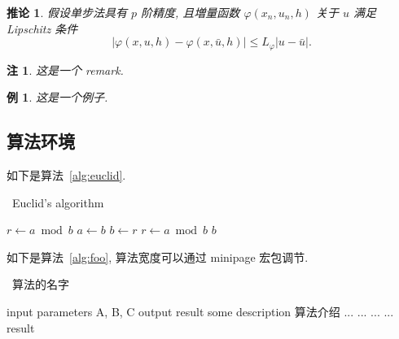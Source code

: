 \documentclass[zihao=-4,twoside,final]{ctexart}
\numberwithin{equation}{section}
\numberwithin{figure}{section}
\numberwithin{table}{section}
\theoremstyle{plain}
\newtheorem{example}{例}
\newtheorem{corollary}{推论}[section]
\newtheorem{remark}{注}[section]
\begin{document}
\begin{corollary}\label{col:convergence}
假设单步法具有 $p$ 阶精度, 且増量函数 $\varphi(x_{n}, u_{n}, h)$ 关于 $u$ 满足 \textup{Lipschitz} 条件
\begin{equation}\label{eq:conver3}
|\varphi(x, u, h)-\varphi(x, \bar{u}, h)| \leqslant L_{\varphi}|u-\bar{u}|.
\end{equation}
\end{corollary}

\begin{remark}\label{rem:remark}
这是一个 remark.
\end{remark}

\begin{example}
这是一个例子.
\end{example}


\clearpage
\subsection{算法环境}

如下是算法~\ref{alg:euclid}.
\begin{algorithm}[H]
\small
\caption{~Euclid's algorithm}\label{alg:euclid}
\begin{algorithmic}[1]
  \State $r\gets a\bmod b$
  \State $a\gets b$
  \State $b\gets r$
  \State $r\gets a\bmod b$
  \EndWhile\label{euclidendwhile}
  \State \Return $b$
  \EndProcedure
\end{algorithmic}
\end{algorithm}

如下是算法~\ref{alg:foo}, 算法宽度可以通过 minipage 宏包调节.

\begin{center}
\vspace{-2ex}
\begin{minipage}{.9\linewidth}
\begin{algorithm}[H]
\caption{~算法的名字}\label{alg:foo}
\begin{algorithmic}[1]
\Require input parameters A, B, C
\Ensure output result
\State some description 算法介绍
  \State ...
    \State ...
    \Else
    \State ...
  \EndIf
\EndFor
{}
  \State ...
\EndWhile
\State \Return result
\end{algorithmic}
\end{algorithm}
\end{minipage}
\end{center}
\end{document}
